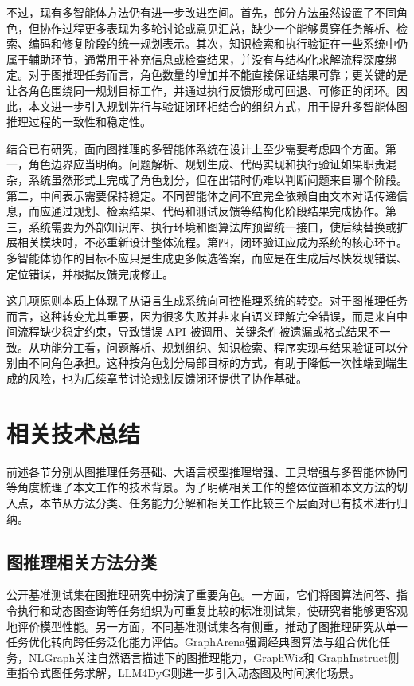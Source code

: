 不过，现有多智能体方法仍有进一步改进空间。首先，部分方法虽然设置了不同角色，但协作过程更多表现为多轮讨论或意见汇总，缺少一个能够贯穿任务解析、检索、编码和修复阶段的统一规划表示。其次，知识检索和执行验证在一些系统中仍属于辅助环节，通常用于补充信息或检查结果，并没有与结构化求解流程深度绑定。对于图推理任务而言，角色数量的增加并不能直接保证结果可靠；更关键的是让各角色围绕同一规划目标工作，并通过执行反馈形成可回退、可修正的闭环。因此，本文进一步引入规划先行与验证闭环相结合的组织方式，用于提升多智能体图推理过程的一致性和稳定性。

结合已有研究，面向图推理的多智能体系统在设计上至少需要考虑四个方面。第一，角色边界应当明确。问题解析、规划生成、代码实现和执行验证如果职责混杂，系统虽然形式上完成了角色划分，但在出错时仍难以判断问题来自哪个阶段。第二，中间表示需要保持稳定。不同智能体之间不宜完全依赖自由文本对话传递信息，而应通过规划、检索结果、代码和测试反馈等结构化阶段结果完成协作。第三，系统需要为外部知识库、执行环境和图算法库预留统一接口，使后续替换或扩展相关模块时，不必重新设计整体流程。第四，闭环验证应成为系统的核心环节。多智能体协作的目标不应只是生成更多候选答案，而应是在生成后尽快发现错误、定位错误，并根据反馈完成修正。

这几项原则本质上体现了从语言生成系统向可控推理系统的转变。对于图推理任务而言，这种转变尤其重要，因为很多失败并非来自语义理解完全错误，而是来自中间流程缺少稳定约束，导致错误 API 被调用、关键条件被遗漏或格式结果不一致。从功能分工看，问题解析、规划组织、知识检索、程序实现与结果验证可以分别由不同角色承担。这种按角色划分局部目标的方式，有助于降低一次性端到端生成的风险，也为后续章节讨论规划反馈闭环提供了协作基础。

\section{相关技术总结}

前述各节分别从图推理任务基础、大语言模型推理增强、工具增强与多智能体协同等角度梳理了本文工作的技术背景。为了明确相关工作的整体位置和本文方法的切入点，本节从方法分类、任务能力分解和相关工作比较三个层面对已有技术进行归纳。

\subsection{图推理相关方法分类}

公开基准测试集在图推理研究中扮演了重要角色。一方面，它们将图算法问答、指令执行和动态图查询等任务组织为可重复比较的标准测试集，使研究者能够更客观地评价模型性能。另一方面，不同基准测试集各有侧重，推动了图推理研究从单一任务优化转向跨任务泛化能力评估。GraphArena\cite{tang2025grapharena}强调经典图算法与组合优化任务，NLGraph\cite{chen2024nlgraph}关注自然语言描述下的图推理能力，GraphWiz\cite{gong2024graphwiz}和 GraphInstruct\cite{graphinstruct2024}侧重指令式图任务求解，LLM4DyG\cite{llm4dyg2024}则进一步引入动态图及时间演化场景。

